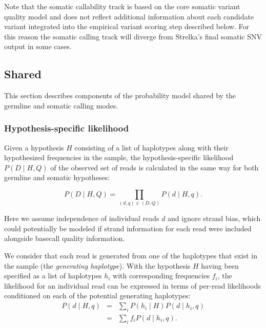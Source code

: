 \documentclass{article}
\begin{document}
Note that the somatic callability track is based on the core somatic variant quality model and does not reflect additional information about each candidate variant integrated into the empirical variant scoring step described below. For this reason the somatic calling track will diverge from Strelka's final somatic SNV output in some cases.

\subsection{Shared}
\label{sec:shared}
This section describes components of the probability model shared by the germline and somatic calling modes.

\subsubsection{Hypothesis-specific likelihood}
\label{sec:shared_lik}

Given a hypothesis $H$ consisting of a list of haplotypes along with their hypothesized frequencies in the sample, the hypothesis-specific likelihood $P(D \mid H,Q)$ of the observed set of reads is calculated in the same way for both germline and somatic hypotheses:

\begin{equation*}
\label{eq:geno_lik}
P(D \mid H,Q) = \prod_{(d,q) \in (D,Q)} P(d \mid H,q).
\end{equation*}

Here we assume independence of individual reads $d$  and ignore strand bias, which could potentially be modeled if strand information for each read were included alongside basecall quality information.

We consider that each read is generated from one of the haplotypes that exist in the sample (the \emph{generating haplotype}). With the hypothesis $H$ having been specified as a list of haplotypes $h_i$ with corresponding frequencies $f_i$, the likelihood for an individual read can be expressed in terms of per-read likelihoods conditioned on each of the potential generating haplotypes:
\begin{eqnarray*}
P(d \mid H,q) & = & \sum_i P(h_i \mid H)P(d \mid h_i,q)\\
& = & \sum_i f_i P(d \mid h_i,q).
\end{eqnarray*}
\end{document}
